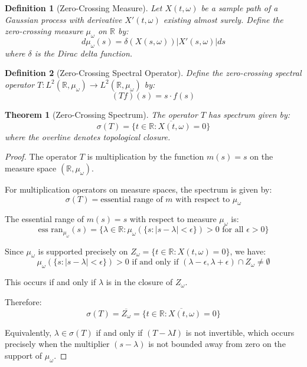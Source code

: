 \documentclass{article}
\newtheorem{theorem}{Theorem}
\newtheorem{definition}{Definition}
\begin{document}
\begin{definition}[Zero-Crossing Measure]
Let $X(t,\omega)$ be a sample path of a Gaussian process with derivative $X'(t,\omega)$ existing almost surely. Define the zero-crossing measure $\mu_\omega$ on $\mathbb{R}$ by:
$$d\mu_\omega(s) = \delta(X(s,\omega)) |X'(s,\omega)| ds$$
where $\delta$ is the Dirac delta function.
\end{definition}

\begin{definition}[Zero-Crossing Spectral Operator]
Define the zero-crossing spectral operator $T: L^2(\mathbb{R}, \mu_\omega) \to L^2(\mathbb{R}, \mu_\omega)$ by:
$$(Tf)(s) = s \cdot f(s)$$
\end{definition}

\begin{theorem}[Zero-Crossing Spectrum]
The operator $T$ has spectrum given by:
$$\sigma(T) = \overline{\{t \in \mathbb{R} : X(t,\omega) = 0\}}$$
where the overline denotes topological closure.
\end{theorem}

\begin{proof}
The operator $T$ is multiplication by the function $m(s) = s$ on the measure space $(\mathbb{R}, \mu_\omega)$. 

For multiplication operators on measure spaces, the spectrum is given by:
$$\sigma(T) = \text{essential range of } m \text{ with respect to } \mu_\omega$$

The essential range of $m(s) = s$ with respect to measure $\mu_\omega$ is:
$$\text{ess ran}_{\mu_\omega}(s) = \{\lambda \in \mathbb{R} : \mu_\omega(\{s : |s - \lambda| < \epsilon\}) > 0 \text{ for all } \epsilon > 0\}$$

Since $\mu_\omega$ is supported precisely on $Z_\omega = \{t \in \mathbb{R} : X(t,\omega) = 0\}$, we have:
$$\mu_\omega(\{s : |s - \lambda| < \epsilon\}) > 0 \text{ if and only if } (\lambda - \epsilon, \lambda + \epsilon) \cap Z_\omega \neq \emptyset$$

This occurs if and only if $\lambda$ is in the closure of $Z_\omega$.

Therefore:
$$\sigma(T) = \overline{Z_\omega} = \overline{\{t \in \mathbb{R} : X(t,\omega) = 0\}}$$

Equivalently, $\lambda \in \sigma(T)$ if and only if $(T - \lambda I)$ is not invertible, which occurs precisely when the multiplier $(s - \lambda)$ is not bounded away from zero on the support of $\mu_\omega$.
\end{proof}
\end{document}
